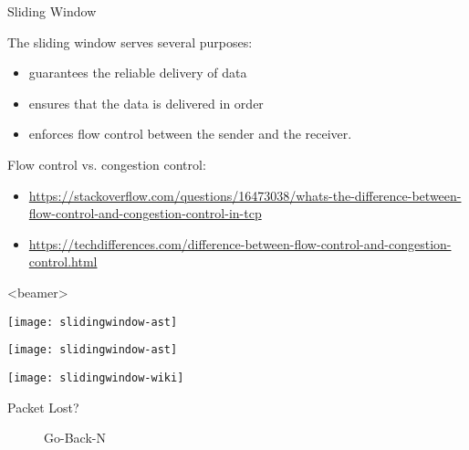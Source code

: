\begin{frame}{Sliding Window}
  \begin{center}
  \end{center}
  \begin{iblock}{The sliding window serves several purposes:}
    \begin{itemize}
    \item guarantees the reliable delivery of data
    \item ensures that the data is delivered in order
    \item enforces flow control between the sender and the receiver.
    \end{itemize}
  \end{iblock}
\end{frame}

Flow control vs. congestion control:
\begin{itemize}
\item
  \url{https://stackoverflow.com/questions/16473038/whats-the-difference-between-flow-control-and-congestion-control-in-tcp}
\item
  \url{https://techdifferences.com/difference-between-flow-control-and-congestion-control.html}
\end{itemize}

\begin{frame}<beamer>
  \begin{center}
    \texttt{[image: slidingwindow-ast]}
  \end{center}
\end{frame}


\begin{minipage}{.48\linewidth}
  \texttt{[image: slidingwindow-ast]}  
\end{minipage}\hfill
\begin{minipage}{.48\linewidth}
  \texttt{[image: slidingwindow-wiki]}
\end{minipage}

\begin{frame}
  \begin{minipage}{.4\linewidth}
    \begin{description}
    \item[Packet Lost?] Go-Back-N
    \end{description}
  \end{minipage}\qquad
  \begin{minipage}{.4\linewidth}
  \end{minipage}
\end{frame}

